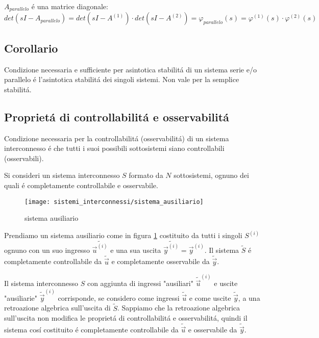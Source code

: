 \documentclass[../main.tex]{subfiles}
\begin{document}
			$ A_{parallelo} $ \'e una matrice diagonale:
			\[
				det(sI-A_{parallelo}) = det(sI-A^{(1)}) \cdot det(sI-A^{(2)}) = \varphi_{parallelo}(s) = \varphi^{(1)}(s) \cdot \varphi^{(2)}(s)
			\]
	\subsection{Corollario}
		Condizione necessaria e sufficiente per asintotica stabilit\'a di un sistema serie e/o parallelo \'e l'asintotica stabilit\'a dei singoli sistemi. Non vale per la semplice stabilit\'a.
		
	\subsection{Propriet\'a di controllabilit\'a e osservabilit\'a}
		Condizione necessaria per la controllabilit\'a (osservabilit\'a) di un sistema interconnesso \'e che tutti i suoi possibili sottosistemi siano controllabili (osservabili).
		
		Si consideri un sistema interconnesso $ S $ formato da $ N $ sottosistemi, ognuno dei quali \'e completamente controllabile e osservabile.
		
		\begin{figure}[H]
			\centering\texttt{[image: sistemi\_interconnessi/sistema\_ausiliario]}
			\caption{sistema ausiliario}
			\label{fig:sistema_ausiliario}
		\end{figure}
		Prendiamo un sistema ausiliario come in figura \ref{fig:sistema_ausiliario} costituito da tutti i singoli $ S^{(i)} $ ognuno con un suo ingresso $ \tilde{\vec u^{(i)}} $ e una sua uscita $ \tilde{\vec y^{(i)}} = \vec{y}^{(i)} $. Il sistema $ \tilde S $ \'e completamente controllabile da $ \tilde{\vec u} $ e completamente osservabile da $ \tilde{\vec y} $.
		
		Il sistema interconnesso $ S $ con aggiunta di ingressi "ausiliari" $ \tilde{\vec u}^{(i)} $ e uscite "ausiliarie" $ \tilde{\vec y}^{(i)} $ corrisponde, se considero come ingressi $ \tilde{\vec u} $ e come uscite $ \tilde{\vec y} $, a una retroazione algebrica sull'uscita di $ \tilde S $. Sappiamo che la retroazione algebrica sull'uscita non modifica le propriet\'a di controllabilit\'a e osservabilit\'a, quindi il sistema cos\'i costituito \'e completamente controllabile da $ \tilde{\vec u} $ e osservabile da $ \tilde{\vec y} $.
		
\end{document}
